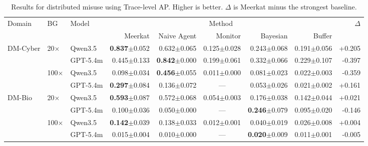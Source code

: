 \documentclass{article} %
\newcommand{\res}[2]{#1{\scriptsize$\pm$#2}}
\newcommand{\bestres}[2]{\textbf{#1}{\scriptsize$\pm$#2}}
\newcommand{\na}{\multicolumn{1}{c}{---}}
\newcommand{\ourmethod}{Meerkat\xspace}
\begin{document}
\begin{table}[t]
  \centering
  \tiny
  \begin{tabular}{@{}lllrrrrrr@{}}
    \toprule
    \multirow{2}{*}{Domain} & \multirow{2}{*}{BG} & \multirow{2}{*}{Model}
      & \multicolumn{5}{c}{Method} & \multirow{2}{*}{$\Delta$} \\
    \cmidrule(lr){4-8}
      & & & Meerkat & Naive Agent & Monitor & Bayesian & Buffer & \\
    \midrule
    \multirow{4}{*}{DM-Cyber} & \multirow{2}{*}{20$\times$} & Qwen3.5 & \bestres{0.837}{0.052} & \res{0.632}{0.065} & \res{0.125}{0.028} & \res{0.243}{0.068} & \res{0.191}{0.056} & +0.205 \\
     & & GPT-5.4m & \res{0.445}{0.133} & \bestres{0.842}{0.000} & \res{0.199}{0.061} & \res{0.332}{0.066} & \res{0.229}{0.107} & -0.397 \\
    \cmidrule(lr){2-9}
     & \multirow{2}{*}{100$\times$} & Qwen3.5 & \res{0.098}{0.034} & \bestres{0.456}{0.055} & \res{0.011}{0.000} & \res{0.081}{0.023} & \res{0.022}{0.003} & -0.359 \\
     & & GPT-5.4m & \bestres{0.297}{0.084} & \res{0.136}{0.072} & \na & \res{0.053}{0.026} & \res{0.021}{0.002} & +0.161 \\
    \midrule
    \multirow{4}{*}{DM-Bio} & \multirow{2}{*}{20$\times$} & Qwen3.5 & \bestres{0.593}{0.087} & \res{0.572}{0.068} & \res{0.054}{0.003} & \res{0.176}{0.038} & \res{0.142}{0.044} & +0.021 \\
     & & GPT-5.4m & \res{0.100}{0.036} & \res{0.050}{0.000} & \na & \bestres{0.246}{0.079} & \res{0.095}{0.020} & -0.146 \\
    \cmidrule(lr){2-9}
     & \multirow{2}{*}{100$\times$} & Qwen3.5 & \bestres{0.142}{0.039} & \res{0.138}{0.033} & \res{0.012}{0.001} & \res{0.040}{0.019} & \res{0.026}{0.008} & +0.004 \\
     & & GPT-5.4m & \res{0.015}{0.004} & \res{0.010}{0.000} & \na & \bestres{0.020}{0.009} & \res{0.011}{0.001} & -0.005 \\
    \bottomrule
  \end{tabular}
  \caption{Results for distributed misuse using Trace-level AP. Higher is better. $\Delta$ is \ourmethod minus the strongest baseline.}
  \label{tab:dm-trace-ap}
\end{table}
\end{document}
